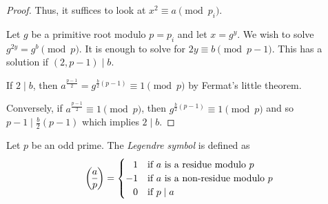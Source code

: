 \begin{proof}
    Thus, it suffices to look at $x^2 \equiv a \pmod{p_i}$.

    Let $g$ be a primitive root modulo $p = p_i$ and let $x = g^y$.
    We wish to solve $g^{2y} = g^b \pmod p$.
    It is enough to solve for $2y \equiv b\pmod{p - 1}$.
    This has a solution if $(2, p - 1) \mid b$.

    If $2 \mid b$, then $a^{\frac{p - 1}{2}} = g^{\frac{b}{2} (p - 1)} \equiv 1 \pmod p$ by Fermat's little theorem.

    Conversely, if $a^{\frac{p - 1}{2}} \equiv 1 \pmod p$,
    then $g^{\frac{b}{2} (p - 1)} \equiv 1 \pmod p$ and so
    $p - 1 \mid \frac{b}{2} (p - 1)$ which implies $2 \mid b$.
\end{proof}

\begin{definition} \label{def:legendre_symbol}
    Let $p$ be an odd prime.
    The \emph{Legendre symbol} is defined as \[
        \lgnd{a}{p} = \begin{cases}
            \hphantom{-}1 & \text{if } a \text{ is a residue modulo } p \\
            -1 & \text{if } a \text{ is a non-residue modulo } p \\
            \hphantom{-}0 & \text{if } p \mid a
        \end{cases}
    \]
\end{definition}

